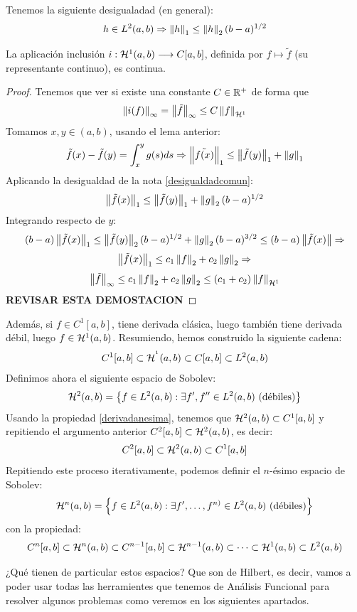 \begin{remark}
\label{desigualdadcomun}
Tenemos la siguiente desigualadad (en general):
\[
h\in\lebesgue{2} \Rightarrow \norm{h}_1\leq \norm{h}_2(b-a)^{1/2}
\]
\end{remark}
\begin{prop}\label{inclusion continua}
La aplicación inclusión $\funcion{i}{\sobolev{1}}{C[a,b]}$, definida por $f\mapsto\tilde{f}$ (su representante continuo), es continua.
\end{prop}
\begin{proof}
Tenemos que ver si existe una constante $C\in\R^+$ de forma que
\[
\norm{i(f)}_{\infty}=\norm{\tilde{f}}_\infty\leq C\normasobolev{1}{f}
\]
Tomamos $x,y\in(a,b)$, usando el lema anterior:
\[
\tilde{f}(x)-\tilde{f}(y)=\integral{x}{y}{g(s)ds} \Rightarrow \norm{\tilde{f(x)}}_1\leq\norm{\tilde{f}(y)}_1+\norm{g}_1
\]
Aplicando la desigualdad de la nota \ref{desigualdadcomun}:
\[
\norm{\tilde{f}(x)}_1\leq \norm{\tilde{f}(y)}_1+\norm{g}_2(b-a)^{1/2}
\]
Integrando respecto de $y$:
\[
(b-a)\norm{\tilde{f}(x)}_1\leq \norm{\tilde{f}(y)}_2(b-a)^{1/2}+\norm{g}_2(b-a)^{3/2}
\leq (b-a)\norm{\tilde{f}(x)} \Rightarrow
\]
\[
\norm{\tilde{f}(x)}_1\leq c_1\norm{f}_2+c_2\norm{g}_2 \Rightarrow
\]
\[
\norm{\tilde{f}}_\infty\leq c_1\norm{f}_2+c_2\norm{g}_2 \leq (c_1+c_2)\normasobolev{1}{f}
\]
\textbf{REVISAR ESTA DEMOSTACION}
\end{proof}
Además, si $f\in C^1[a,b]$, tiene derivada clásica, luego también tiene derivada débil, luego $f\in\sobolev{1}$. Resumiendo, hemos construido la siguiente cadena:
\[
C^1[a,b]\subset\sobolev{^1}\subset C[a,b]\subset \lebesgue{2}
\]
Definimos ahora el siguiente espacio de Sobolev:
\[
\sobolev{2}=\conjunto{f\in\lebesgue{2}: \exists f',f''\in\lebesgue{2}\text{ (débiles)}}
\]
Usando la propiedad \ref{derivadanesima}, tenemos que $\sobolev{2}\subset C^1[a,b]$ y repitiendo el argumento anterior $C^2[a,b]\subset \sobolev{2}$, es decir:
\[
C^2[a,b]\subset \sobolev{2}\subset C^1[a,b]
\]
Repitiendo este proceso iterativamente, podemos definir el $n$-ésimo espacio de Sobolev:
\[
\sobolev{n}=\conjunto{f\in\lebesgue{2}: \exists f',\dots,f^{n)}\in\lebesgue{2} \text{ (débiles)}}
\]
con la propiedad:
\[
C^{n}[a,b]\subset\sobolev{n}\subset C^{n-1}[a,b]\subset\sobolev{n-1}\subset\dots\subset\sobolev{1}\subset\lebesgue{2}
\]

¿Qué tienen de particular estos espacios? Que son de Hilbert, es decir, vamos a poder usar todas las herramientes que tenemos de Análisis Funcional para resolver algunos problemas como veremos en los siguientes apartados.

